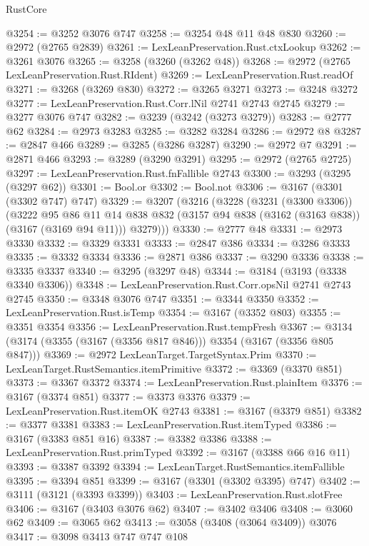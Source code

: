 \begin{lexlean}{RustCore}
\begin{coremodule}
@3254 := @3252 @3076 @747
@3258 := @3254 @48 @11 @48 @830
@3260 := @2972 (@2765 @2839)
@3261 := LexLeanPreservation.Rust.ctxLookup
@3262 := @3261 @3076
@3265 := @3258 (@3260 (@3262 @48))
@3268 := @2972 (@2765 LexLeanPreservation.Rust.RIdent)
@3269 := LexLeanPreservation.Rust.readOf
@3271 := @3268 (@3269 @830)
@3272 := @3265 @3271
@3273 := @3248 @3272
@3277 := LexLeanPreservation.Rust.Corr.lNil @2741 @2743 @2745
@3279 := @3277 @3076 @747
@3282 := @3239 (@3242 (@3273 @3279))
@3283 := @2777 @62
@3284 := @2973 @3283
@3285 := @3282 @3284
@3286 := @2972 @8
@3287 := @2847 @466
@3289 := @3285 (@3286 @3287)
@3290 := @2972 @7
@3291 := @2871 @466
@3293 := @3289 (@3290 @3291)
@3295 := @2972 (@2765 @2725)
@3297 := LexLeanPreservation.Rust.fnFallible @2743
@3300 := @3293 (@3295 (@3297 @62))
@3301 := Bool.or
@3302 := Bool.not
@3306 := @3167 (@3301 (@3302 @747) @747)
@3329 := @3207
    (@3216
      (@3228
        (@3231 (@3300 @3306))
        (@3222
          @95
          @86
          @11
          @14
          @838
          @832
          (@3157 @94 @838 (@3162 (@3163 @838)) (@3167 (@3169 @94 @11)))
          @3279)))
@3330 := @2777 @48
@3331 := @2973 @3330
@3332 := @3329 @3331
@3333 := @2847 @386
@3334 := @3286 @3333
@3335 := @3332 @3334
@3336 := @2871 @386
@3337 := @3290 @3336
@3338 := @3335 @3337
@3340 := @3295 (@3297 @48)
@3344 := @3184 (@3193 (@3338 @3340 @3306))
@3348 := LexLeanPreservation.Rust.Corr.opsNil @2741 @2743 @2745
@3350 := @3348 @3076 @747
@3351 := @3344 @3350
@3352 := LexLeanPreservation.Rust.isTemp
@3354 := @3167 (@3352 @803)
@3355 := @3351 @3354
@3356 := LexLeanPreservation.Rust.tempFresh
@3367 := @3134 (@3174 (@3355 (@3167 (@3356 @817 @846))) @3354 (@3167 (@3356 @805 @847)))
@3369 := @2972 LexLeanTarget.TargetSyntax.Prim
@3370 := LexLeanTarget.RustSemantics.itemPrimitive
@3372 := @3369 (@3370 @851)
@3373 := @3367 @3372
@3374 := LexLeanPreservation.Rust.plainItem
@3376 := @3167 (@3374 @851)
@3377 := @3373 @3376
@3379 := LexLeanPreservation.Rust.itemOK @2743
@3381 := @3167 (@3379 @851)
@3382 := @3377 @3381
@3383 := LexLeanPreservation.Rust.itemTyped
@3386 := @3167 (@3383 @851 @16)
@3387 := @3382 @3386
@3388 := LexLeanPreservation.Rust.primTyped
@3392 := @3167 (@3388 @66 @16 @11)
@3393 := @3387 @3392
@3394 := LexLeanTarget.RustSemantics.itemFallible
@3395 := @3394 @851
@3399 := @3167 (@3301 (@3302 @3395) @747)
@3402 := @3111 (@3121 (@3393 @3399))
@3403 := LexLeanPreservation.Rust.slotFree
@3406 := @3167 (@3403 @3076 @62)
@3407 := @3402 @3406
@3408 := @3060 @62
@3409 := @3065 @62
@3413 := @3058 (@3408 (@3064 @3409)) @3076
@3417 := @3098 @3413 @747 @747 @108

\end{coremodule}
\end{lexlean}
